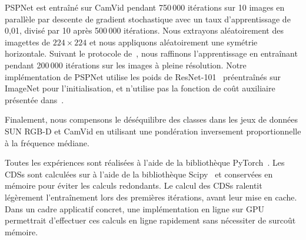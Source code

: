 PSPNet est entraîné sur CamVid pendant 750\,000 itérations sur 10 images en parallèle par descente de gradient stochastique avec un taux d'apprentissage de 0,01, divisé par 10 après 500\,000 itérations. Nous extrayons aléatoirement des imagettes de $224\times224$ et nous appliquons aléatoirement une symétrie horizontale. Suivant le protocole de~\cite{jegou_one_2017}, nous raffinons l'apprentissage en entraînant pendant 200\,000 itérations sur les images à pleine résolution.
Notre implémentation de PSPNet utilise les poids de ResNet-101~\cite{he_deep_2016} préentraînés sur ImageNet pour l'initialisation, et n'utilise pas la fonction de coût auxiliaire présentée dans~\cite{zhao_pyramid_2017}.

Finalement, nous compensons le déséquilibre des classes dans les jeux de données SUN RGB-D et CamVid en utilisant une pondération inversement proportionnelle à la fréquence médiane.

Toutes les expériences sont réalisées à l'aide de la bibliothèque PyTorch~\cite{noauthor_pytorch_2016}. Les \glspl{CDS} sont calculées sur  à l'aide de la bibliothèque Scipy~\cite{jones_scipy_2001} et conservées en mémoire pour éviter les calculs redondants. Le calcul des \glspl{CDS} ralentit légèrement l'entraînement lors des premières itérations, avant leur mise en cache. Dans un cadre applicatif concret, une implémentation en ligne sur GPU~\cite{zampirolli_fast_2017} permettrait d'effectuer ces calculs en ligne rapidement sans nécessiter de surcoût mémoire.

